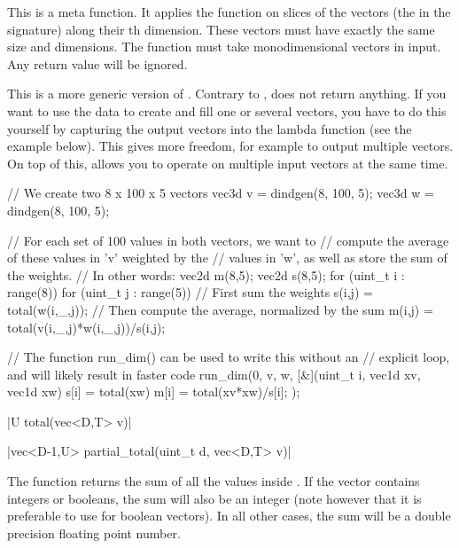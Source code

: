 \begin{advanced}
This is a meta function. It applies the function  on slices of the  vectors (the  in the signature) along their th dimension. These  vectors must have exactly the same size and dimensions. The function  must take  monodimensional vectors in input. Any return value will be ignored.

This is a more generic version of . Contrary to ,  does not return anything. If you want to use the data to create and fill one or several vectors, you have to do this yourself by capturing the output vectors into the lambda function (see the example below). This gives more freedom, for example to output multiple vectors. On top of this,  allows you to operate on multiple input vectors at the same time.

\begin{example}
\begin{cppcode}
// We create two 8 x 100 x 5 vectors
vec3d v = dindgen(8, 100, 5);
vec3d w = dindgen(8, 100, 5);

// For each set of 100 values in both vectors, we want to
// compute the average of these values in 'v' weighted by the
// values in 'w', as well as store the sum of the weights.
// In other words:
vec2d m(8,5);
vec2d s(8,5);
for (uint_t i : range(8))
for (uint_t j : range(5)) {
    // First sum the weights
    s(i,j) = total(w(i,_,j));
    // Then compute the average, normalized by the sum
    m(i,j) = total(v(i,_,j)*w(i,_,j))/s(i,j);
}

// The function run_dim() can be used to write this without an
// explicit loop, and will likely result in faster code
run_dim(0, v, w, [&](uint_t i, vec1d xv, vec1d xw) {
    s[i] = total(xw)
    m[i] = total(xv*xw)/s[i];
});
\end{cppcode}
\end{example}
\end{advanced}

\funcitem \cppinline|U total(vec<D,T> v)| 

\cppinline|vec<D-1,U> partial_total(uint_t d, vec<D,T> v)| 

The function  returns the sum of all the values inside . If the vector contains integers or booleans, the sum will also be an integer (note however that it is preferable to use  for boolean vectors). In all other cases, the sum will be a double precision floating point number.

